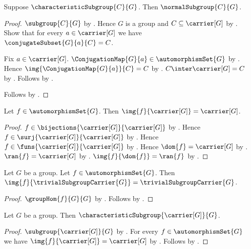 \begin{theorem}\label{characteristic_subgroup_is_normal}
    Suppose $\characteristicSubgroup{C}{G}$.
    Then $\normalSubgroup{C}{G}$.
\end{theorem}
\begin{proof}
    $\subgroup{C}{G}$ by
        .
    Hence $G$ is a group and $C\subseteq\carrier[G]$ by
        .
    Show that for every $a\in\carrier[G]$ we have
        $\conjugateSubset{G}{a}{C}=C$.
    \begin{subproof}
        Fix $a\in\carrier[G]$.
        $\ConjugationMap{G}{a}\in\automorphismSet{G}$ by
            .
        Hence $\img{\ConjugationMap{G}{a}}{C}=C$ by
            .
        $C\inter\carrier[G]=C$ by
            .
        Follows by .
    \end{subproof}
    Follows by .
\end{proof}

\begin{proposition}\label{automorphism_image_carrier}
    Let $f\in\automorphismSet{G}$.
    Then $\img{f}{\carrier[G]}=\carrier[G]$.
\end{proposition}
\begin{proof}
    $f\in\bijections{\carrier[G]}{\carrier[G]}$ by
        .
    Hence $f\in\surj{\carrier[G]}{\carrier[G]}$ by
        .
    Hence $f\in\funs{\carrier[G]}{\carrier[G]}$ by
        .
    Hence $\dom{f}=\carrier[G]$ by .
    $\ran{f}=\carrier[G]$ by .
    $\img{f}{\dom{f}}=\ran{f}$ by .
\end{proof}

\begin{proposition}\label{automorphism_image_trivial_carrier}
    Let $G$ be a group.
    Let $f\in\automorphismSet{G}$.
    Then
        $\img{f}{\trivialSubgroupCarrier{G}}=
            \trivialSubgroupCarrier{G}$.
\end{proposition}
\begin{proof}
    $\groupHom{f}{G}{G}$ by .
    Follows by .
\end{proof}

\begin{proposition}\label{full_carrier_characteristic_subgroup}
    Let $G$ be a group.
    Then $\characteristicSubgroup{\carrier[G]}{G}$.
\end{proposition}
\begin{proof}
    $\subgroup{\carrier[G]}{G}$ by
        .
    For every $f\in\automorphismSet{G}$ we have
        $\img{f}{\carrier[G]}=\carrier[G]$ by
        .
    Follows by .
\end{proof}

